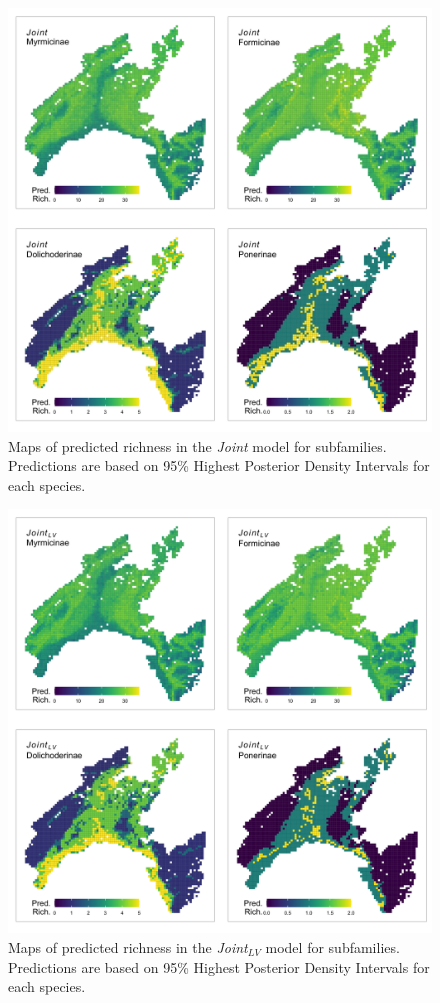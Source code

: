 \documentclass[preprint,review,times,12pt]{elsarticle}
\begin{document}
\begin{figure}
	\centering\includegraphics[width=5in]{ms/1_Ecography/1/figs/maps/sf_S_J.png}
	\caption{\label{fig:sf_map_Joint} Maps of predicted richness in the \emph{Joint} model for subfamilies. Predictions are based on 95\% Highest Posterior Density Intervals for each species. }
\end{figure}

\begin{figure}
	\centering\includegraphics[width=5in]{ms/1_Ecography/1/figs/maps/sf_S_J+LV.png}
	\caption{\label{fig:sf_map_Joint+LV} Maps of predicted richness in the \emph{Joint}$_{LV}$ model for subfamilies. Predictions are based on 95\% Highest Posterior Density Intervals for each species. }
\end{figure}
\end{document}
